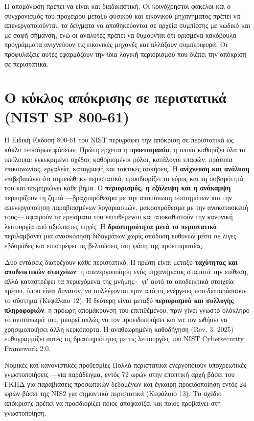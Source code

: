 \documentclass[11pt,openany]{book}
\begin{document}
Η απομόνωση πρέπει να είναι και διαδικαστική. Οι κοινόχρηστοι φάκελοι και ο συγχρονισμός του προχείρου μεταξύ φυσικού και εικονικού μηχανήματος πρέπει να απενεργοποιούνται, τα δείγματα να αποθηκεύονται σε αρχεία συμπίεσης με κωδικό και με σαφή σήμανση, ενώ οι αναλυτές πρέπει να θυμούνται ότι ορισμένα κακόβουλα προγράμματα ανιχνεύουν τις εικονικές μηχανές και αλλάζουν συμπεριφορά. Οι προφυλάξεις αυτές εφαρμόζουν την ίδια λογική περιορισμού που διέπει την απόκριση σε περιστατικά.

\section{Ο κύκλος απόκρισης σε περιστατικά (NIST SP 800-61)}\label{sec:11.6}
Η Ειδική Έκδοση 800-61 του NIST περιγράφει την απόκριση σε περιστατικά ως κύκλο τεσσάρων φάσεων. Πρώτη έρχεται η \textbf{προετοιμασία}, η οποία καθορίζει όλα τα υπόλοιπα: εγκεκριμένο σχέδιο, καθορισμένοι ρόλοι, κατάλογοι επαφών, πρότυπα επικοινωνίας, εργαλεία, καταγραφή και τακτικές ασκήσεις. Η \textbf{ανίχνευση και ανάλυση} επιβεβαιώνει ότι σημειώθηκε περιστατικό, προσδιορίζει το εύρος και τη σοβαρότητά του και τεκμηριώνει κάθε βήμα. Ο \textbf{περιορισμός, η εξάλειψη και η ανάκαμψη} περιορίζουν τη ζημιά —βραχυπρόθεσμα με την απομόνωση συστημάτων και την απενεργοποίηση παραβιασμένων λογαριασμών, μακροπρόθεσμα με την ανακατασκευή τους— αφαιρούν τα ερείσματα του επιτιθέμενου και αποκαθιστούν την κανονική λειτουργία από αξιόπιστες πηγές. Η \textbf{δραστηριότητα μετά το περιστατικό} περιλαμβάνει μια ανασκόπηση διδαγμάτων χωρίς απόδοση ευθυνών μέσα σε λίγες εβδομάδες και επιστρέφει τις βελτιώσεις στη φάση της προετοιμασίας.

Δύο εντάσεις διατρέχουν κάθε περιστατικό. Η πρώτη είναι μεταξύ \textbf{ταχύτητας και αποδεικτικών στοιχείων}: η απενεργοποίηση ενός μηχανήματος σταματά την επίθεση, αλλά καταστρέφει τα περιεχόμενα της μνήμης· γι' αυτό τα αποδεικτικά στοιχεία πρέπει, όπου είναι δυνατόν, να συλλέγονται πριν από τις ενέργειες που διαταράσσουν το σύστημα (Κεφάλαιο 12). Η δεύτερη είναι μεταξύ \textbf{περιορισμού και συλλογής πληροφοριών}: η πρόωρη απομάκρυνση του επιτιθέμενου, πριν γίνει γνωστό ολόκληρο το αποτύπωμά του, μπορεί απλώς να τον προειδοποιήσει και να τον ωθήσει να χρησιμοποιήσει άλλη κερκόπορτα. Η αναθεωρημένη καθοδήγηση (Rev. 3, 2025) ευθυγραμμίζει αυτές τις δραστηριότητες με τις λειτουργίες του NIST Cybersecurity Framework 2.0.

\begin{notebox}{Νομικές και κανονιστικές προθεσμίες}
Πολλά περιστατικά ενεργοποιούν υποχρεωτικές γνωστοποιήσεις —για παράδειγμα, εντός 72 ωρών στην εποπτική αρχή βάσει του ΓΚΠΔ για παραβιάσεις προσωπικών δεδομένων και έγκαιρη προειδοποίηση εντός 24 ωρών βάσει της NIS2 για σημαντικά περιστατικά (Κεφάλαιο 13). Το σχέδιο απόκρισης πρέπει να προσδιορίζει ποιος αποφασίζει και ποιος προβαίνει στη γνωστοποίηση.
\end{notebox}
\end{document}
